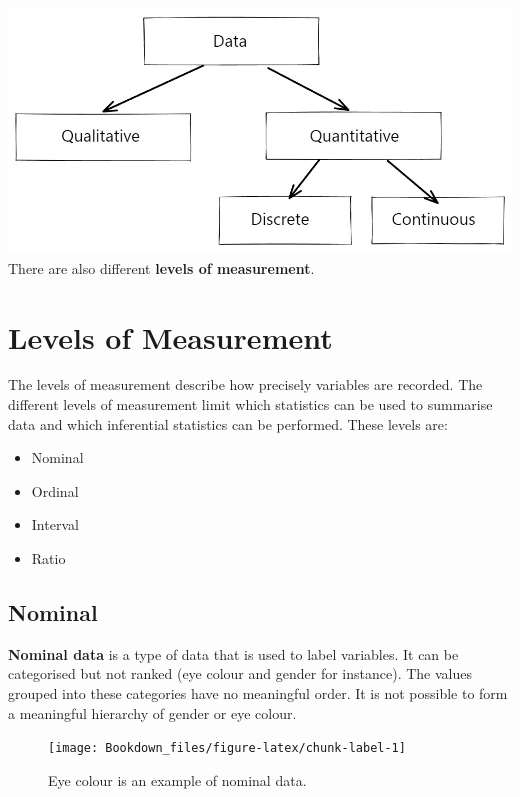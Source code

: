 \documentclass[
]{book}
\providecommand{\tightlist}{%
  \setlength{\itemsep}{0pt}\setlength{\parskip}{0pt}}
\begin{document}
\includegraphics{data.jpg}
There are also different \textbf{levels of measurement}.

\hypertarget{levels-of-measurement}{%
\section{Levels of Measurement}\label{levels-of-measurement}}

The levels of measurement describe how precisely variables are recorded. The different levels of measurement limit which statistics can be used to summarise data and which inferential statistics can be performed. These levels are:

\begin{itemize}
\tightlist
\item
  Nominal
\item
  Ordinal
\item
  Interval
\item
  Ratio
\end{itemize}

\hypertarget{nominal}{%
\subsection{Nominal}\label{nominal}}

\textbf{Nominal data} is a type of data that is used to label variables. It can be categorised but not ranked (eye colour and gender for instance). The values grouped into these categories have no meaningful order. It is not possible to form a meaningful hierarchy of gender or eye colour.

\begin{figure}

{\centering \texttt{[image: Bookdown\_files/figure-latex/chunk-label-1]} 

}

\caption{Eye colour is an example of nominal data.}\label{fig:chunk-label}
\end{figure}
\end{document}
